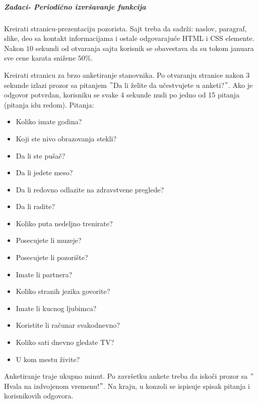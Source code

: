 \subparagraph{Zadaci- Periodično izvršavanje funkcija}
\begin{primer}
Kreirati stranicu-prezentaciju pozorista. Sajt treba da sadrži: naslov, paragraf, slike, deo sa kontakt informacijama i ostale odgovarajuće HTML i CSS elemente. Nakon $10$ sekundi od otvaranja sajta korisnik se obavestava da su tokom januara sve cene karata snižene $50\%$. 
\end{primer}

\begin{primer}
Kreirati stranicu za brzo anketiranje stanovnika. Po otvaranju stranice nakon 3 sekunde izlazi prozor sa pitanjem $"$Da li želite da učestvujete u anketi?$"$. Ako je odgovor potvrdan, korisniku se svake 4 sekunde nudi po jedno od 15 pitanja (pitanja idu redom). Pitanja:
\begin{itemize}
\item Koliko imate godina?
\item Koji ste nivo obrazovanja stekli?
\item Da li ste pušač?
\item Da li jedete meso?
\item Da li redovno odlazite na zdravstvene preglede?
\item Da li radite?
\item Koliko puta nedeljno trenirate?
\item Posecujete li muzeje?
\item Posecujete li pozorište?
\item Imate li partnera?
\item Koliko stranih jezika govorite?
\item Imate li kucnog ljubimca?
\item Koristite li računar svakodnevno?
\item Koliko sati dnevno gledate TV?
\item U kom mestu živite?
\end{itemize}  
Anketiranje traje ukupno minut. Po završetku ankete treba da iskoči prozor sa $"$Hvala na izdvojenom vremenu!$"$. Na kraju, u konzoli se ispisuje spisak pitanja i korisnikovih odgovora. 
\end{primer}
\newpage

